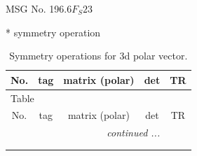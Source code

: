 \documentclass[fleqn,8pt]{jsarticle}
\begin{document}
\setcounter{MaxMatrixCols}{32}

\renewcommand{\tablename}{Table~}
\renewcommand{\figurename}{Figure~}
\begin{center}
\LARGE
MSG No. 196.6\quad$F_{S}23$
\end{center}
* symmetry operation
\renewcommand{\arraystretch}{1.3}
\begin{longtable}{ccccc}
\caption{Symmetry operations for 3d polar vector.}
 \\
 \hline \hline
No. & tag & matrix (polar) & det & TR \\ \hline \endfirsthead

\multicolumn{4}{l}{\tablename\ \thetable{}} \\
 \hline \hline
No. & tag & matrix (polar) & det & TR \\ \hline \endhead

 \hline \hline
\multicolumn{4}{r}{\footnotesize\it continued ...} \\ \endfoot

 \hline \hline
\multicolumn{4}{r}{} \\ \endlastfoot


\end{longtable}
\end{document}
